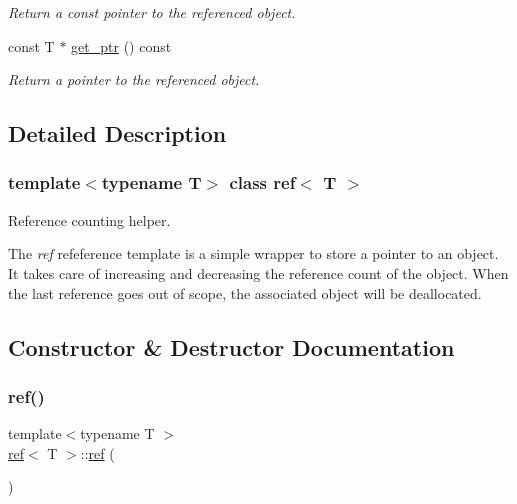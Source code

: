 \begin{DoxyCompactItemize}
\begin{DoxyCompactList}\small\item\em Return a const pointer to the referenced object. \end{DoxyCompactList}\item 
const T $\ast$ \mbox{\hyperlink{classref_a76b8f2eec00eb3c3041cc9c7fb14ba0b}{get\+\_\+ptr}} () const
\begin{DoxyCompactList}\small\item\em Return a pointer to the referenced object. \end{DoxyCompactList}\end{DoxyCompactItemize}


\subsection{Detailed Description}
\subsubsection*{template$<$typename T$>$\newline
class ref$<$ T $>$}

Reference counting helper. 

The {\itshape ref} refeference template is a simple wrapper to store a pointer to an object. It takes care of increasing and decreasing the reference count of the object. When the last reference goes out of scope, the associated object will be deallocated. 

\subsection{Constructor \& Destructor Documentation}
\mbox{\label{classref_a32c2f3c2bde5b57e6ef0a80254773854}} 
\subsubsection{\texorpdfstring{ref()}{ref()}\hspace{0.1cm}{\footnotesize\ttfamily [1/4]}}
{\footnotesize\ttfamily template$<$typename T $>$ \\
\mbox{\hyperlink{classref}{ref}}$<$ T $>$\+::\mbox{\hyperlink{classref}{ref}} (\begin{DoxyParamCaption}{ }\end{DoxyParamCaption})\hspace{0.3cm}{\ttfamily [inline]}}




